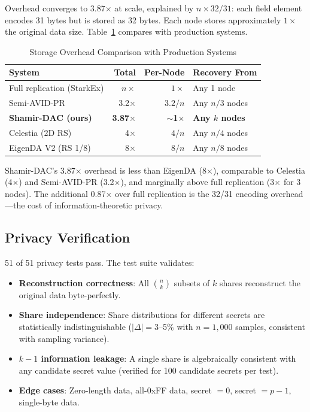 Overhead converges to 3.87$\times$ at scale, explained by $n \times 32/31$:
each field element encodes 31 bytes but is stored as 32 bytes. Each node
stores approximately $1\times$ the original data size. Table~\ref{tab:overhead_compare}
compares with production systems.

\begin{table}[h]
\centering
\caption{Storage Overhead Comparison with Production Systems}
\label{tab:overhead_compare}
\begin{tabular}{lrrl}
\toprule
\textbf{System} & \textbf{Total} & \textbf{Per-Node} &
\textbf{Recovery From} \\
\midrule
Full replication (StarkEx) & $n \times$ & $1\times$ & Any 1 node \\
Semi-AVID-PR               & 3.2$\times$ & $3.2/n$ & Any $n/3$ nodes \\
\textbf{Shamir-DAC (ours)} & \textbf{3.87$\times$} & $\sim$\textbf{1$\times$} & \textbf{Any $k$ nodes} \\
Celestia (2D RS)           & 4$\times$   & $4/n$   & Any $n/4$ nodes \\
EigenDA V2 (RS 1/8)        & 8$\times$   & $8/n$   & Any $n/8$ nodes \\
\bottomrule
\end{tabular}
\end{table}

Shamir-DAC's 3.87$\times$ overhead is less than EigenDA (8$\times$),
comparable to Celestia (4$\times$) and Semi-AVID-PR (3.2$\times$), and
marginally above full replication (3$\times$ for 3 nodes). The additional
0.87$\times$ over full replication is the 32/31 encoding overhead---the
cost of information-theoretic privacy.

\subsection{Privacy Verification}

51 of 51 privacy tests pass. The test suite validates:

\begin{itemize}
\item \textbf{Reconstruction correctness}: All $\binom{n}{k}$ subsets of $k$
  shares reconstruct the original data byte-perfectly.
\item \textbf{Share independence}: Share distributions for different secrets
  are statistically indistinguishable ($|\Delta| = 3$--5\% with $n=1{,}000$
  samples, consistent with sampling variance).
\item \textbf{$k-1$ information leakage}: A single share is algebraically
  consistent with any candidate secret value (verified for 100 candidate
  secrets per test).
\item \textbf{Edge cases}: Zero-length data, all-0xFF data, secret $= 0$,
  secret $= p-1$, single-byte data.
\end{itemize}

